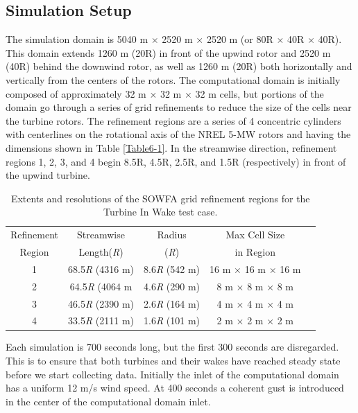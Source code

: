 \subsection{Simulation Setup} \label{section6-7-1}

The simulation domain is 5040 m $\times$ 2520 m $\times$ 2520 m (or 80R $\times$ 40R $\times$ 40R). This domain extends 1260 m (20R) in front of the upwind rotor and 2520 m (40R) behind the downwind rotor, as well as 1260 m (20R) both horizontally and vertically from the centers of the rotors. The computational domain is initially composed of approximately 32 m $\times$ 32 m $\times$ 32 m cells, but portions of the domain go through a series of grid refinements to reduce the size of the cells near the turbine rotors. The refinement regions are a series of 4 concentric cylinders with centerlines on the rotational axis of the NREL 5-MW rotors and having the dimensions shown in Table \ref{Table6-1}. In the streamwise direction, refinement regions 1, 2, 3, and 4 begin 8.5R, 4.5R, 2.5R, and 1.5R (respectively) in front of the upwind turbine.

\begin{table}[ht]
\centering
\begin{tabular}{c c c c c}
\hline
Refinement & Streamwise       & Radius     & Max Cell Size\\
Region     & Length(\emph{R}) & (\emph{R}) &  in Region\\
\hline
1          & 68.5\emph{R} (4316 m)  & 8.6\emph{R} (542 m) & 16 m $\times$ 16 m $\times$ 16 m\\
2          & 64.5\emph{R} (4064 m   & 4.6\emph{R} (290 m) & 8 m $\times$ 8 m $\times$ 8 m\\
3          & 46.5\emph{R} (2390 m)  & 2.6\emph{R} (164 m) & 4 m $\times$ 4 m $\times$ 4 m\\
4          & 33.5\emph{R} (2111 m)  & 1.6\emph{R} (101 m) & 2 m $\times$ 2 m $\times$ 2 m\\
\hline
\end{tabular}
\caption{ Extents and resolutions of the SOWFA grid refinement regions for the Turbine In Wake test case.}
 \label{Table6-5}
\end{table}

Each simulation is 700 seconds long, but the first 300 seconds are disregarded. This is to ensure that both turbines and their wakes have reached steady state before we start collecting data. Initially the inlet of the computational domain has a uniform 12 m/s wind speed. At 400 seconds a coherent gust is introduced in the center of the computational domain inlet. 

